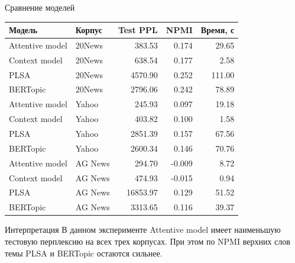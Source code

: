 \documentclass[aspectratio=169]{beamer}
\newcommand{\model}{Attentive model}
\newcommand{\contextmodel}{Context model}
\newcommand{\plsa}{PLSA}
\newcommand{\bertopic}{BERTopic}
\begin{document}
\begin{frame}{Сравнение моделей}
    \centering
    \scriptsize
    \begin{tabular}{@{}llrrr@{}}
        \toprule
        Модель & Корпус & Test PPL & NPMI & Время, с\\
        \midrule
        \model & 20News & 383.53 & 0.174 & 29.65\\
        \contextmodel & 20News & 638.54 & 0.177 & 2.58\\
        \plsa & 20News & 4570.90 & 0.252 & 111.00\\
        \bertopic & 20News & 2796.06 & 0.242 & 78.89\\
        \midrule
        \model & Yahoo & 245.93 & 0.097 & 19.18\\
        \contextmodel & Yahoo & 403.82 & 0.100 & 1.58\\
        \plsa & Yahoo & 2851.39 & 0.157 & 67.56\\
        \bertopic & Yahoo & 2600.34 & 0.146 & 70.76\\
        \midrule
        \model & AG News & 294.70 & -0.009 & 8.72\\
        \contextmodel & AG News & 474.93 & -0.015 & 0.94\\
        \plsa & AG News & 16853.97 & 0.129 & 51.52\\
        \bertopic & AG News & 3313.65 & 0.116 & 39.37\\
        \bottomrule
    \end{tabular}

    \vspace{0.18cm}
    \begin{block}{Интерпретация}
        В данном эксперименте \model{} имеет наименьшую тестовую перплексию на
        всех трех корпусах. При этом по NPMI верхних слов темы \plsa{} и
        \bertopic{} остаются сильнее.
    \end{block}
\end{frame}
\end{document}
